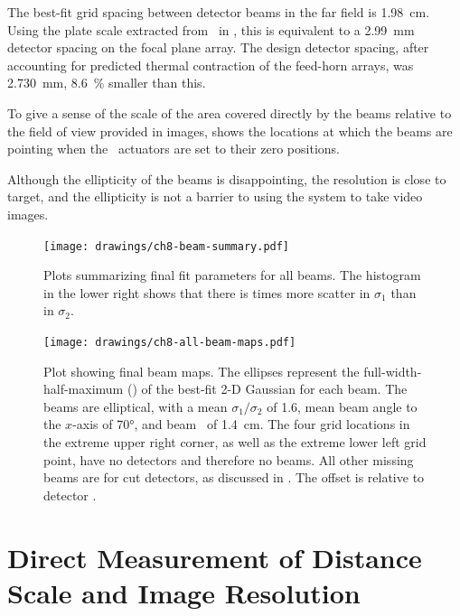 The best-fit grid spacing between detector beams in the far field is \SI{1.98}{\cm}.
Using the plate scale extracted from \ZEMAX\ in , this is equivalent to a \SI{2.99}{\mm} detector spacing on the focal plane array.
The design detector spacing, after accounting for predicted thermal contraction of the feed-horn arrays, was \SI{2.730}{\mm}, \SI{8.6}{\percent} smaller than this.

To give a sense of the scale of the area covered directly by the beams relative to the field of view provided in images,  shows the locations at which the beams are pointing when the \BOSE\ actuators are set to their zero positions.

Although the ellipticity of the beams is disappointing, the resolution is close to target, and the ellipticity is not a barrier to using the system to take video images.

\begin{figure}
\centering
\texttt{[image: drawings/ch8-beam-summary.pdf]}
\caption{
  Plots summarizing final fit parameters for all beams.
  The histogram in the lower right shows that there is  times more scatter in $\sigma_1$ than in $\sigma_2$. 
}
\label{fig:ch8-beam-summary}
\end{figure}

\begin{figure}
\centering
\texttt{[image: drawings/ch8-all-beam-maps.pdf]}
\caption{
Plot showing final beam maps.
The ellipses represent the full-width-half-maximum (\FWHM) of the best-fit 2-D Gaussian for each beam. The beams are elliptical, with a mean $\sigma_1/\sigma_2$ of 1.6, mean beam angle to the $x$-axis of \ang{70}, and beam \FWHM\ of \SI{1.4}{\cm}.
The four grid locations in the extreme upper right corner, as well as the extreme lower left grid point, have no detectors and therefore no beams. All other missing beams are for cut detectors, as discussed in .
The offset is relative to detector .
}
\label{fig:ch8-all-beam-maps}
\end{figure}

\section{Direct Measurement of Distance Scale and Image Resolution} \label{sec:ch8-dist-scale}


